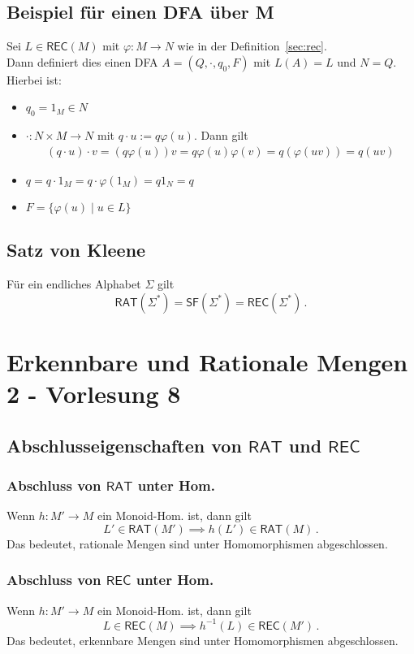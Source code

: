 \documentclass[12pt, german]{article}
\newcommand{\inv}{^{-1}}
\newcommand{\rat}{\mathsf{RAT}}
\newcommand{\rec}{\mathsf{REC}}
\newcommand{\starfree}{\mathsf{SF}}
\begin{document}
	\subsection{Beispiel für einen DFA über M}
	Sei $L \in \rec(M)$ mit $\varphi: M \to N$ wie in der Definition~\ref{sec:rec}. \\ 
	Dann definiert dies einen DFA $A = (Q,\cdot, q_0, F)$ mit $L(A) = L$ und $N = Q$. 
	Hierbei ist: 
	\begin{itemize}
		\item $q_0 = 1_M \in N$
		\item $\cdot : N \times M \to N$ mit $q\cdot u := q\varphi(u)$. Dann gilt
		\begin{align*}
			(q \cdot u)\cdot v = (q\varphi(u))v = q \varphi(u)\varphi(v) = q(\varphi(uv)) = q(uv)
		\end{align*}
		\item $q = q \cdot 1_M = q \cdot \varphi(1_M) = q1_N = q$
		\item $F = \{\varphi(u) \mid u \in L \}$
	\end{itemize}

	\subsection{Satz von Kleene}
	Für ein endliches Alphabet $\Sigma$ gilt $$\rat(\Sigma^*)=\starfree(\Sigma^*)=\rec(\Sigma^*)\,.$$
	
	\section{Erkennbare und Rationale Mengen 2 - Vorlesung 8}
	\subsection{Abschlusseigenschaften von $\rat$ und $\rec$}
	\subsubsection{Abschluss von $\rat$ unter Hom.}
	Wenn $h: M' \to M$ ein Monoid-Hom. ist, dann gilt $$L' \in \rat(M') \implies h(L') \in \rat(M)\, .$$
	Das bedeutet, rationale Mengen sind unter Homomorphismen abgeschlossen.
	
	\subsubsection{Abschluss von $\rec$ unter Hom.}
	Wenn $h: M' \to M$ ein Monoid-Hom. ist, dann gilt $$L \in \rec(M) \implies h\inv(L) \in \rec(M')\, .$$
	Das bedeutet, erkennbare Mengen sind unter Homomorphismen abgeschlossen.
	
\end{document}
